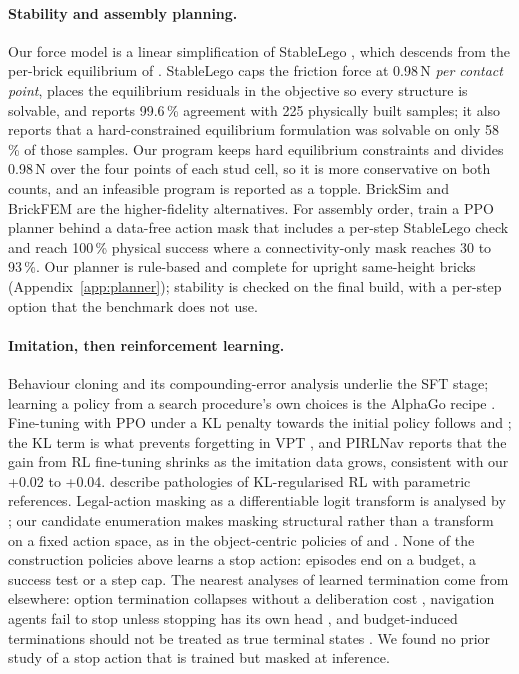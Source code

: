 \paragraph{Stability and assembly planning.} Our force model is a linear simplification of StableLego
\citep{liu2024stablelego}, which descends from the per-brick equilibrium of \citet{luo2015legolization}. StableLego
caps the friction force at 0.98\,N \emph{per contact point}, places the equilibrium residuals in the objective so
every structure is solvable, and reports 99.6\,\% agreement with 225 physically built samples; it also reports
that a hard-constrained equilibrium formulation was solvable on only 58\,\% of those samples. Our program keeps
hard equilibrium constraints and divides 0.98\,N over the four points of each stud cell, so it is more conservative
on both counts, and an infeasible program is reported as a topple. BrickSim \citep{wen2026bricksim} and BrickFEM
\citep{pletz2023brickfem} are the higher-fidelity alternatives. For assembly order, \citet{liu2025physicsawareasp}
train a PPO planner behind a data-free action mask that includes a per-step StableLego check and reach 100\,\%
physical success where a connectivity-only mask reaches 30 to 93\,\%. Our planner is rule-based and complete for
upright same-height bricks (Appendix~\ref{app:planner}); stability is checked on the final build, with a per-step
option that the benchmark does not use.

\paragraph{Imitation, then reinforcement learning.} Behaviour cloning \citep{pomerleau1989alvinn} and its
compounding-error analysis \citep{ross2011dagger} underlie the SFT stage; learning a policy from a search procedure's
own choices is the AlphaGo recipe \citep{silver2016alphago,silver2017alphagozero,anthony2017exit}. Fine-tuning
with PPO \citep{schulman2017ppo} under a KL penalty towards the initial policy follows \citet{ziegler2019finetuning}
and \citet{ouyang2022instructgpt}; the KL term is what prevents forgetting in VPT \citep{baker2022vpt}, and
PIRLNav \citep{ramrakhya2023pirlnav} reports that the gain from RL fine-tuning shrinks as the imitation data grows,
consistent with our +0.02 to +0.04. \citet{rudner2021klpathologies} describe pathologies of KL-regularised RL with
parametric references. Legal-action masking as a differentiable logit transform is analysed by
\citet{huang2022invalidmasking}; our candidate enumeration makes masking structural rather than a transform on a
fixed action space, as in the object-centric policies of \citet{bapst2019structuredagents} and
\citet{ghasemipour2022blocksassemble}. None of the construction policies above learns a stop action: episodes end
on a budget, a success test or a step cap. The nearest analyses of learned termination come from elsewhere:
option termination collapses without a deliberation cost \citep{harb2017deliberationcost}, navigation agents fail
to stop unless stopping has its own head \citep{xiang2020learningtostop}, and budget-induced terminations should not
be treated as true terminal states \citep{pardo2018timelimits}. We found no prior study of a stop action that is
trained but masked at inference.

